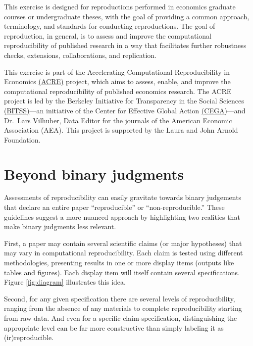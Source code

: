 \documentclass[]{book}
\begin{document}
This exercise is designed for reproductions performed in economics graduate courses or undergraduate theses, with the goal of providing a common approach, terminology, and standards for conducting reproductions. The goal of reproduction, in general, is to assess and improve the computational reproducibility of published research in a way that facilitates further robustness checks, extensions, collaborations, and replication.

This exercise is part of the Accelerating Computational Reproducibility in Economics \href{https://www.bitss.org/ecosystem/acre/}{(ACRE)} project, which aims to assess, enable, and improve the computational reproducibility of published economics research. The ACRE project is led by the Berkeley Initiative for Transparency in the Social Sciences \href{https://bitss.org}{(BITSS)}---an initiative of the Center for Effective Global Action \href{https://cega.berkeley.edu/}{(CEGA)}---and Dr.~Lars Vilhuber, Data Editor for the journals of the American Economic Association (AEA). This project is supported by the Laura and John Arnold Foundation.

\hypertarget{beyond-binary-judgments}{%
\section*{Beyond binary judgments}\label{beyond-binary-judgments}}

Assessments of reproducibility can easily gravitate towards binary judgements that declare an entire paper ``reproducible'' or ``non-reproducible.'' These guidelines suggest a more nuanced approach by highlighting two realities that make binary judgments less relevant.

First, a paper may contain several scientific claims (or major hypotheses) that may vary in computational reproducibility. Each claim is tested using different methodologies, presenting results in one or more display items (outputs like tables and figures). Each display item will itself contain several specifications. Figure \ref{fig:diagram} illustrates this idea.

Second, for any given specification there are several levels of reproducibility, ranging from the absence of any materials to complete reproducibility starting from raw data. And even for a specific claim-specification, distinguishing the appropriate level can be far more constructive than simply labeling it as (ir)reproducible.
\end{document}
